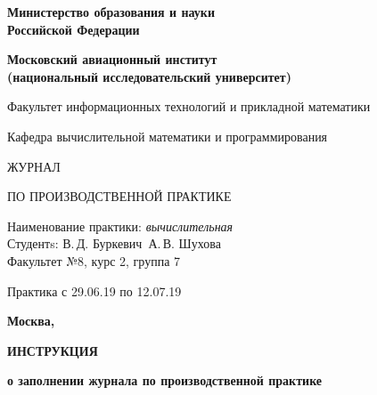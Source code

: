 \documentclass[dvipsnames,pdf, unicode, 12pt, a4paper, oneside, fleqn]{article}
\begin{document}
\begin{titlepage}
\begin{center}
\bfseries{\Large Министерство образования и науки\\Российской Федерации}

\vspace{12pt}

\bfseries{\Large Московский авиационный институт\\ (национальный исследовательский университет)}

\vspace{48pt}


{\large Факультет информационных технологий и прикладной математики}

\vspace{36pt}


{\large Кафедра вычислительной математики и программирования}

\vspace{48pt}

{\huge ЖУРНАЛ}

\vspace{12pt}

{\large ПО ПРОИЗВОДСТВЕННОЙ ПРАКТИКЕ}


\end{center}

\vspace{72pt}

\begin{flushleft}
Наименование практики: {\itshape вычислительная}\\
Студентs: В.\,Д. Буркевич\, А.\,В. Шухова \\
Факультет №8, курс 2, группа 7 \\
\end{flushleft}

\vspace{12pt}

\begin{flushleft}
Практика с 29.06.19 по 12.07.19
\end{flushleft}

\vfill

\begin{center}
\bfseries Москва, \the\year
\end{center}
\end{titlepage}

\pagebreak

\begin{center}
\bfseries{\large ИНСТРУКЦИЯ }

\vspace{12pt}

\bfseries{о заполнении журнала по производственной практике}
\end{center}
\end{document}
